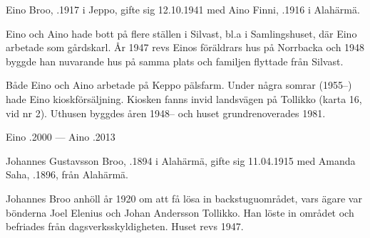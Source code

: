 
Eino Broo, .1917 i Jeppo, gifte sig 12.10.1941 med Aino Finni, .1916 i Alahärmä.
\begin{jhchildren}
  \item {}
  \item {}
  \item {}
  \item {}
\end{jhchildren}
Eino och Aino hade bott på flere ställen i Silvast, bl.a i Samlingshuset, där Eino arbetade som gårdskarl. År 1947 revs Einos föräldrars hus på Norrbacka och 1948 byggde han nuvarande hus på samma plats och familjen flyttade från Silvast.

Både Eino och Aino arbetade på Keppo pälsfarm. Under några somrar (1955--) hade Eino kioskförsäljning. Kiosken fanns invid landsvägen på Tollikko (karta 16, vid nr 2). Uthusen byggdes åren 1948-- och huset grundrenoverades 1981.

Eino .2000  ---  Aino .2013




Johannes Gustavsson Broo, .1894 i Alahärmä, gifte sig 11.04.1915 med Amanda Saha, .1896, från Alahärmä.
\begin{jhchildren}
  \item {}
  \item {}
  \item {}
  \item {}
\end{jhchildren}

Johannes Broo anhöll år 1920 om att få lösa in backstuguområdet, vars ägare var bönderna Joel Elenius och Johan Andersson Tollikko. Han löste in området och befriades från dagsverksskyldigheten. Huset revs 1947.

